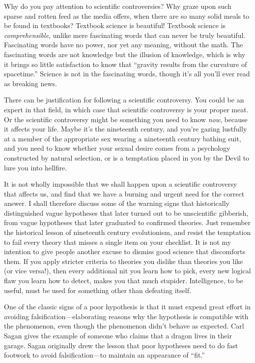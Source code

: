 {
 Why do you pay attention to scientific controversies? Why graze
upon such sparse and rotten feed as the media offers, when there are so
many solid meals to be found in textbooks? Textbook science is
beautiful! Textbook science is \textit{comprehensible}, unlike mere
fascinating words that can never be truly beautiful. Fascinating words
have no power, nor yet any meaning, without the math. The fascinating
words are not knowledge but the illusion of knowledge, which is why it
brings so little satisfaction to know that ``gravity
results from the curvature of spacetime.'' Science is
not in the fascinating words, though it's all
you'll ever read as breaking news.}

{
 There can be justification for following a scientific controversy.
You could be an expert in that field, in which case that scientific
controversy is your proper meat. Or the scientific controversy might be
something you need to know \textit{now}, because it affects your life.
Maybe it's the nineteenth century, and
you're gazing lustfully at a member of the appropriate
sex wearing a nineteenth century bathing suit, and you need to know
whether your sexual desire comes from a psychology constructed by
natural selection, or is a temptation placed in you by the Devil to
lure you into hellfire.}

{
 It is not wholly impossible that we shall happen upon a scientific
controversy that affects us, and find that we have a burning and urgent
need for the correct answer. I shall therefore discuss some of the
warning signs that historically distinguished vague hypotheses that
later turned out to be unscientific gibberish, from vague hypotheses
that later graduated to confirmed theories. Just remember the
historical lesson of nineteenth century evolutionism, and resist the
temptation to fail every theory that misses a single item on your
checklist. It is not my intention to give people another excuse to
dismiss good science that discomforts them. If you apply stricter
criteria to theories you dislike than theories you like (or vice
versa!), then every additional nit you learn how to pick, every new
logical flaw you learn how to detect, makes you that much stupider.
Intelligence, to be useful, must be used for something other than
defeating itself.}

{
 One of the classic signs of a poor hypothesis is that it must
expend great effort in avoiding falsification---elaborating reasons why
the hypothesis is compatible with the phenomenon, even though the
phenomenon didn't behave as expected. Carl Sagan gives
the example of someone who claims that a dragon lives in their garage.
Sagan originally drew the lesson that poor hypotheses need to do fast
footwork to avoid falsification---to maintain an appearance of
``fit.''}

